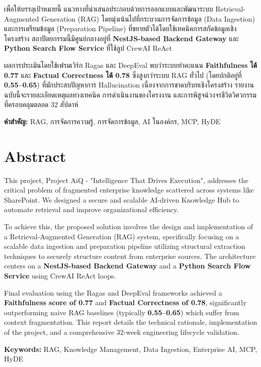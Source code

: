 \documentclass[12pt]{article}
\begin{document}
เพื่อให้บรรลุเป้าหมายนี้ แนวทางที่นำเสนอประกอบด้วยการออกแบบและพัฒนาระบบ Retrieval-Augmented Generation (RAG) โดยมุ่งเน้นไปที่กระบวนการจัดการข้อมูล (Data Ingestion) และการเตรียมข้อมูล (Preparation Pipeline) ที่ขยายตัวได้โดยใช้เทคนิคการสกัดข้อมูลเชิงโครงสร้าง สถาปัตยกรรมนี้มีศูนย์กลางอยู่ที่ \textbf{NestJS-based Backend Gateway} และ \textbf{Python Search Flow Service} ที่ใช้ลูป CrewAI ReAct

ผลการประเมินโดยใช้เฟรมเวิร์ก Ragas และ DeepEval พบว่าระบบทำคะแนน \textbf{Faithfulness ได้ 0.77} และ \textbf{Factual Correctness ได้ 0.78} ซึ่งสูงกว่าระบบ RAG ทั่วไป (โดยปกติอยู่ที่ \textbf{0.55--0.65}) ที่มักประสบปัญหาการ Hallucination เนื่องจากการขาดบริบทเชิงโครงสร้าง รายงานฉบับนี้จะรายละเอียดเหตุผลทางเทคนิค การดำเนินงานของโครงงาน และการพิสูจน์วงจรชีวิตวิศวกรรมที่ครอบคลุมตลอด 32 สัปดาห์

\textbf{คำสำคัญ:} RAG, การจัดการความรู้, การจัดการข้อมูล, AI ในองค์กร, MCP, HyDE

\newpage

\section*{Abstract}
This project, Project AiQ - "Intelligence That Drives Execution", addresses the critical problem of fragmented enterprise knowledge scattered across systems like SharePoint. We designed a secure and scalable AI-driven Knowledge Hub to automate retrieval and improve organizational efficiency.

To achieve this, the proposed solution involves the design and implementation of a Retrieval-Augmented Generation (RAG) system, specifically focusing on a scalable data ingestion and preparation pipeline utilizing structural extraction techniques to securely structure content from enterprise sources. The architecture centers on a \textbf{NestJS-based Backend Gateway} and a \textbf{Python Search Flow Service} using CrewAI ReAct loops.

Final evaluation using the Ragas and DeepEval frameworks achieved a \textbf{Faithfulness score of 0.77} and \textbf{Factual Correctness of 0.78}, significantly outperforming naive RAG baselines (typically \textbf{0.55--0.65}) which suffer from context fragmentation. This report details the technical rationale, implementation of the project, and a comprehensive 32-week engineering lifecycle validation.

\textbf{Keywords:} RAG, Knowledge Management, Data Ingestion, Enterprise AI, MCP, HyDE
\end{document}
